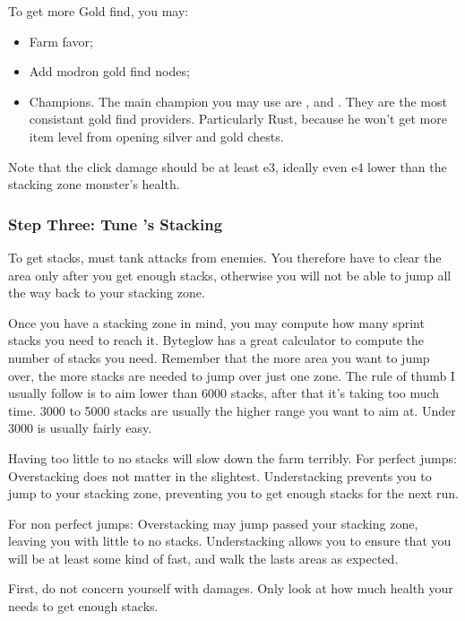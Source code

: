 \documentclass{article}
\begin{document}
To get more Gold find, you may:
\begin{itemize}
    \item Farm favor;
    \item Add modron gold find nodes;
    \item Champions.
    The main champion you may use are \rust, \jarlaxle and \azaka.
    They are the most consistant gold find providers.
    Particularly Rust, because he won't get more item level from opening silver and gold chests.
\end{itemize}

Note that the click damage should be at least e3, ideally even e4 lower than the stacking zone monster's health.

\subsubsection{Step Three: Tune \briv's Stacking}
\label{sec:stepThree}

To get stacks, \briv must tank attacks from enemies.
You therefore have to clear the area only after you get enough stacks, otherwise you will not be able to jump all the way back to your stacking zone.


Once you have a stacking zone in mind, you may compute how many sprint stacks you need to reach it.
Byteglow has a great calculator to compute the number of stacks you need.
Remember that the more area you want to jump over, the more stacks are needed to jump over just one zone.
The rule of thumb I usually follow is to aim lower than 6000 stacks, after that it's taking too much time.
3000 to 5000 stacks are usually the higher range you want to aim at.
Under 3000 is usually fairly easy.


Having too little to no stacks will slow down the farm terribly.
For perfect jumps:
    Overstacking does not matter in the slightest.
    Understacking prevents you to jump to your stacking zone, preventing you to get enough stacks for the next run.

For non perfect jumps:
    Overstacking may jump passed your stacking zone, leaving you with little to no stacks.
    Understacking allows you to ensure that you will be at least some kind of fast, and walk the lasts areas as expected.

First, do not concern yourself with damages.
Only look at how much health your \briv needs to get enough stacks.
\end{document}
